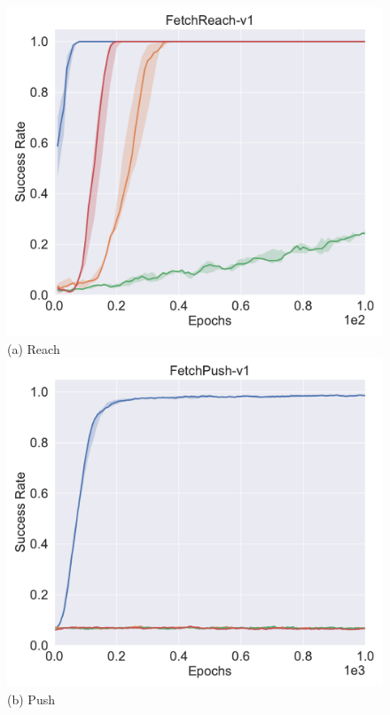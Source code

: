 \begin{figure}[h!]
\centering
{}
  \centering
  \includegraphics[width=\linewidth]{figures/chapter3/reach_baseline.pdf}
  ({a}) Reach
\endminipage
{}%
  \centering
  \includegraphics[width=\linewidth]{figures/chapter3/push_baseline.pdf}
  ({b}) Push
\endminipage\hfill
{}%
  \centering

\end{figure}
